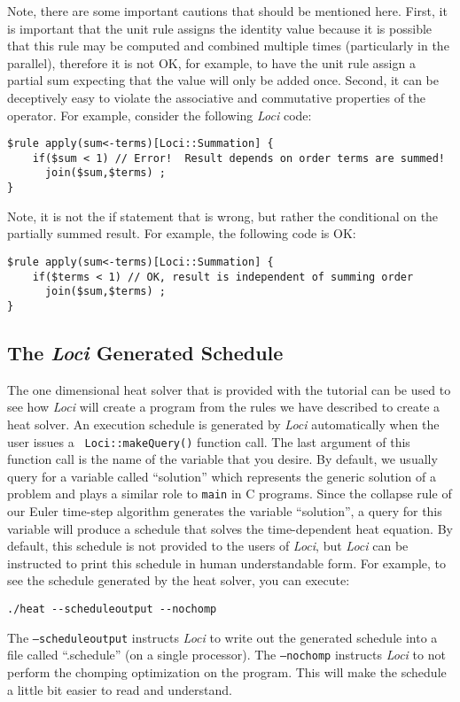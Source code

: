 \documentclass[10pt,epsf]{book}
\begin{document}
Note, there are some important cautions that should be mentioned
here.  First, it is important that the unit rule assigns the identity
value because it is possible that this rule may be computed and
combined multiple times (particularly in the parallel), therefore it
is not OK, for example, to have the unit rule assign a partial sum
expecting that the value will only be added once.  Second, it can be
deceptively easy to violate the associative and commutative properties
of the operator.  For example, consider the following {\it Loci} code:
\begin{verbatim}
$rule apply(sum<-terms)[Loci::Summation] {
    if($sum < 1) // Error!  Result depends on order terms are summed!
      join($sum,$terms) ; 
}
\end{verbatim}
Note, it is not the if statement that is wrong, but rather the
conditional on the partially summed result.  For example, the
following code is OK:
\begin{verbatim}
$rule apply(sum<-terms)[Loci::Summation] {
    if($terms < 1) // OK, result is independent of summing order
      join($sum,$terms) ; 
}
\end{verbatim}

\subsection{The {\it Loci} Generated Schedule}

The one dimensional heat solver that is provided with the tutorial can
be used to see how {\it Loci} will create a program from the rules we have
described to create a heat solver. An execution schedule is generated
by {\it Loci} automatically when the user issues a {\tt
  Loci::makeQuery()} function call.  The last argument of this
function call is the name of the variable that you desire.  By
default, we usually query for a variable called ``solution'' which
represents the generic solution of a problem and plays a similar role
to {\tt main} in C programs.  Since the collapse rule of our Euler
time-step algorithm generates the variable ``solution'', a query for
this variable will produce a schedule that solves the time-dependent
heat equation.  By default, this schedule is not provided to the users
of {\it Loci}, but {\it Loci} can be instructed to print this schedule
in human understandable form.  For example, to see the schedule
generated by the heat solver, you can execute:
\begin{verbatim}
./heat --scheduleoutput --nochomp
\end{verbatim}
The {\tt --scheduleoutput} instructs {\it Loci} to write out the
generated schedule into a file called ``.schedule'' (on a single
processor).  The {\tt --nochomp} instructs {\it Loci} to not perform
the chomping optimization on the program.  This will make the schedule
a little bit easier to read and understand.
\end{document}
